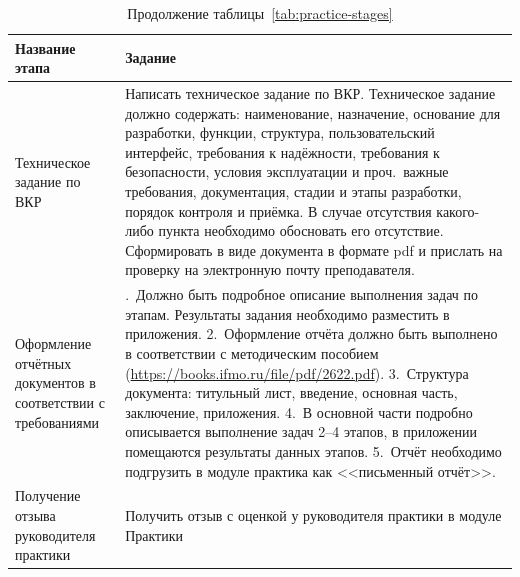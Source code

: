 \newpage
\begin{table}[h]
  \centering
  \caption*{Продолжение таблицы~\ref{tab:practice-stages}}
  \renewcommand{\arraystretch}{1.2}
  \begin{tabularx}{\textwidth}{|>{\raggedright\arraybackslash}p{}|>{\raggedright\arraybackslash}X|}
    \hline
    \textbf{Название этапа} & \textbf{Задание} \\
    \hline
    Техническое задание по ВКР & Написать техническое задание по ВКР. Техническое задание должно содержать: наименование, назначение, основание для разработки, функции, структура, пользовательский интерфейс, требования к надёжности, требования к безопасности, условия эксплуатации и проч.\ важные требования, документация, стадии и этапы разработки, порядок контроля и приёмка. В случае отсутствия какого-либо пункта необходимо обосновать его отсутствие. Сформировать в виде документа в формате pdf и прислать на проверку на электронную почту преподавателя. \\
    \hline
    Оформление отчётных документов в соответствии с требованиями & 1.~Должно быть подробное описание выполнения задач по этапам. Результаты задания необходимо разместить в приложения. 2.~Оформление отчёта должно быть выполнено в соответствии с методическим пособием (\url{https://books.ifmo.ru/file/pdf/2622.pdf}). 3.~Структура документа: титульный лист, введение, основная часть, заключение, приложения. 4.~В основной части подробно описывается выполнение задач 2--4 этапов, в приложении помещаются результаты данных этапов. 5.~Отчёт необходимо подгрузить в модуле практика как <<письменный отчёт>>. \\
    \hline
    Получение отзыва руководителя практики & Получить отзыв с оценкой у руководителя практики в модуле Практики \\
    \hline
  \end{tabularx}
\end{table}